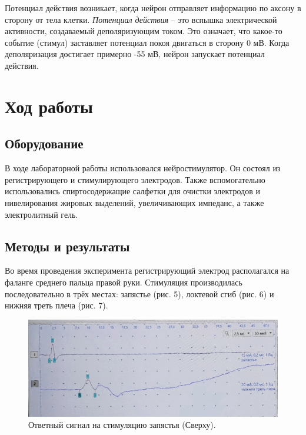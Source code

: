 \documentclass{article}
\begin{document}
        Потенциал действия возникает, когда нейрон отправляет информацию по
        аксону в сторону от тела клетки. \textit{Потенциал действия} – это вспышка электрической
        активности, создаваемый деполяризующим током. Это означает, что какое-то
        событие (стимул) заставляет потенциал покоя двигаться в сторону 0 мВ. Когда
        деполяризация достигает примерно -55 мВ, нейрон запускает потенциал действия.
        \newpage

    \section*{Ход работы}

        \subsection*{Оборудование}

            \hspace*{4mm} В ходе лабораторной работы использовался нейростимулятор. Он состоял из регистрирующего
            и стимулирующего электродов. Также вспомогательно использовались спиртосодержащие салфетки
            для очистки электродов и нивелирования жировых выделений, увеличивающих импеданс, а также 
            электролитный гель.

        \subsection*{Методы и результаты}

            \hspace*{4mm} Во время проведения эксперимента регистрирующий электрод располагался на фаланге среднего пальца правой руки.
            Стимуляция производилась последовательно в трёх местах: запястье (рис. 5), локтевой сгиб (рис. 6) и нижняя треть плеча (рис. 7).

            \begin{figure}[h]
                \centering
                \includegraphics[width=\textwidth]{data/1,2.jpg}
                \caption{Ответный сигнал на стимуляцию запястья (Сверху).}
            \end{figure}
\end{document}
